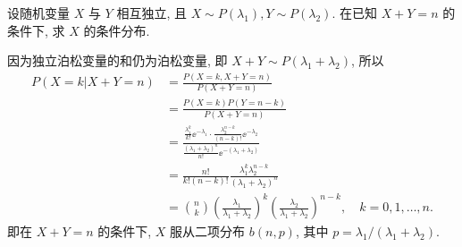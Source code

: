 \begin{example}\label{exam:3.5.2}
    设随机变量 $X$ 与 $Y$ 相互独立, 且 $X\sim P(\lambda_1),Y\sim P(\lambda_2)$. 在已知 $X+Y=n$ 的条件下, 求 $X$ 的条件分布.
\end{example}
\begin{solution}
    因为独立泊松变量的和仍为泊松变量, 即 $X+Y\sim P(\lambda_1+\lambda_2)$, 所以
    \begin{align*}
        P(X=k | X+Y=n) & =\frac{P(X=k, X+Y=n)}{P(X+Y=n)}                                                                   \\
                       & =\frac{P(X=k) P(Y=n-k)}{P(X+Y=n)}                                                                 \\
                       & =\frac{\frac{\lambda_1^k}{k!}\ee^{-\lambda_1}\cdot\frac{\lambda_2^{n-k}}{(n-k)!}\ee^{-\lambda_2}}
        {\frac{(\lambda_1+\lambda_2)^n}{n!}\ee^{-(\lambda_1+\lambda_2)}}                                                   \\
                       & =\frac{n!}{k!(n-k)!}\frac{\lambda_1^k\lambda_2^{n-k}}{(\lambda_1+\lambda_2)^n}                    \\
                       & =\binom{n}{k}\left(\frac{\lambda_1}{\lambda_1+\lambda_2}\right)^k
        \left(\frac{\lambda_2}{\lambda_1+\lambda_2}\right)^{n-k},\quad k=0,1,\dots,n.
    \end{align*}
    即在 $X+Y=n$ 的条件下, $X$ 服从二项分布 $b(n,p)$, 其中 $p=\lambda_1/(\lambda_1+\lambda_2)$.
\end{solution}

